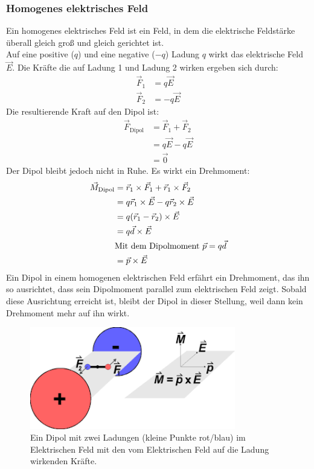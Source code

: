 \documentclass{article}
\begin{document}
\subsubsection{Homogenes elektrisches Feld}
Ein homogenes elektrisches Feld ist ein Feld, in dem die elektrische Feldstärke überall gleich groß und gleich gerichtet ist.\\
Auf eine positive ($q$) und eine negative ($-q$) Ladung $q$ wirkt das elektrische Feld $\vec{E}$.
Die Kräfte die auf Ladung 1 und Ladung 2 wirken ergeben sich durch:
\begin{align}
    \vec{F}_1&=q\vec{E}\\
    \vec{F}_2&=-q\vec{E}
\end{align}
Die resultierende Kraft auf den Dipol ist:
\begin{align}
    \vec{F}_\mathrm{Dipol}&=\vec{F}_1+\vec{F}_2\\
    &=q\vec{E}-q\vec{E}\\
    &=\vec{0}
\end{align}
Der Dipol bleibt jedoch nicht in Ruhe. Es wirkt ein Drehmoment:
\begin{align}
    \vec{M}_\mathrm{Dipol}&=\vec{r}_1\times \vec{F}_1+\vec{r}_1\times \vec{F}_2\\
    &=q\vec{r}_1\times \vec{E}-q\vec{r}_2\times\vec{E}\\
    &=q(\vec{r}_1-\vec{r}_2)\times\vec{E}\\
    &=q \vec{d}\times \vec{E}\\
    &\text{Mit dem Dipolmoment}\ \vec{p}=q\vec{d}\notag\\
    &=\vec{p}\times \vec{E}
\end{align}
Ein Dipol in einem homogenen elektrischen Feld erfährt ein Drehmoment,
das ihn so ausrichtet, dass sein Dipolmoment parallel zum elektrischen Feld zeigt.
Sobald diese Ausrichtung erreicht ist, bleibt der Dipol in dieser Stellung,
weil dann kein Drehmoment mehr auf ihn wirkt.
\begin{figure}[H]
    \centering
    \includegraphics[width=0.80\textwidth]{Dipol im elektrischen Feld.png}
    \caption{Ein Dipol mit zwei Ladungen (kleine Punkte rot/blau) im Elektrischen Feld mit den vom Elektrischen Feld auf die Ladung wirkenden Kräfte.}
\end{figure}
\end{document}
